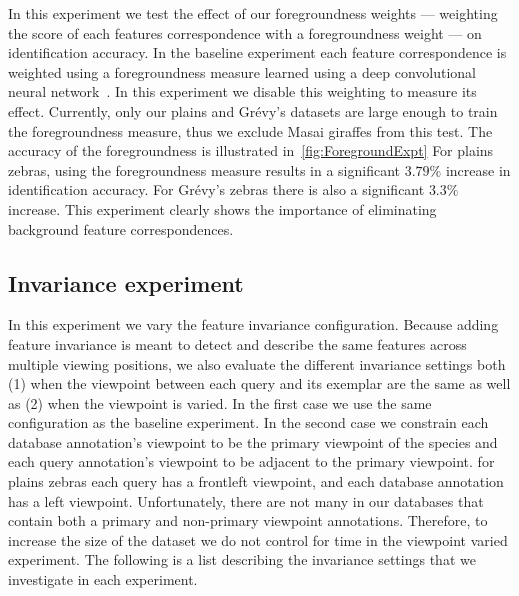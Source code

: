         \ForegroundExpt{}

        In this experiment we test the effect of our foregroundness weights --- weighting the score of each
          features correspondence with a foregroundness weight --- on identification accuracy.
        In the baseline experiment each feature correspondence is weighted using a foregroundness measure learned
          using a deep convolutional neural network~\cite{parham_photographic_2015}.
        In this experiment we disable this weighting to measure its effect.
        Currently, only our plains and Grévy's datasets are large enough to train the foregroundness measure,
          thus we exclude Masai giraffes from this test.
        The accuracy of the foregroundness is illustrated in~\cref{fig:ForegroundExpt} For plains zebras, using
          the foregroundness measure results in a significant $3.79\percent$ increase in identification accuracy.
        For Grévy's zebras there is also a significant $3.3\percent$ increase.
        This experiment clearly shows the importance of eliminating background feature correspondences.
     
    \subsection{Invariance experiment}\label{sub:exptinvar} 
        In this experiment we vary the feature invariance configuration.
        Because adding feature invariance is meant to detect and describe the same features across multiple viewing
          positions, we also evaluate the different invariance settings both
        (1) when the viewpoint between each query and its \groundtrue{} exemplar are the same as well as
        (2) when the viewpoint is varied.
        In the first case we use the same \timectrl{} configuration as the baseline experiment.
        In the second case we constrain each database annotation's viewpoint to be the primary viewpoint of the
          species and each query annotation's viewpoint to be adjacent to the primary viewpoint.
        \Eg{} for plains zebras each query has a frontleft viewpoint, and each database annotation has a left
          viewpoint.
        Unfortunately, there are not many \names{} in our databases that contain both a primary and non-primary
          viewpoint annotations.
        Therefore, to increase the size of the dataset we do not control for time in the viewpoint varied experiment.
        The following is a list describing the invariance settings that we investigate in each experiment.

